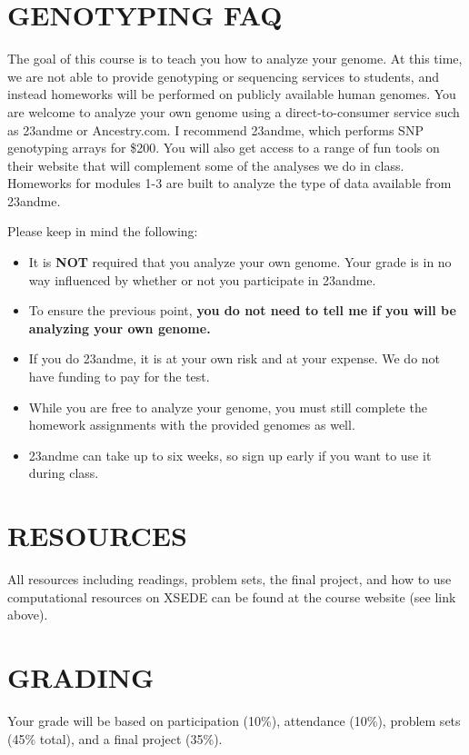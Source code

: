 \documentclass[12pt]{article}
\begin{document}
\section*{GENOTYPING FAQ}
The goal of this course is to teach you how to analyze your genome. At this time, we are not able to provide genotyping or sequencing services to students, and instead homeworks will be performed on publicly available human genomes. You are welcome to analyze your own genome using a direct-to-consumer service such as 23andme or Ancestry.com. I recommend 23andme, which performs SNP genotyping arrays for \$200. You will also get access to a range of fun tools on their website that will complement some of the analyses we do in class. Homeworks for modules 1-3 are built to analyze the type of data available from 23andme. 

Please keep in mind the following:
\begin{itemize}
\setlength\itemsep{0.0em}
\item It is \textbf{NOT} required that you analyze your own genome. Your grade is in no way influenced by whether or not you participate in 23andme.
\item To ensure the previous point, \textbf{you do not need to tell me if you will be analyzing your own genome.}
\item If you do 23andme, it is at your own risk and at your expense. We do not have funding to pay for the test.
\item While you are free to analyze your genome, you must still complete the homework assignments with the provided genomes as well.
\item 23andme can take up to six weeks, so sign up early if you want to use it during class.
\end{itemize}

\section*{RESOURCES}
All resources including readings, problem sets, the final project, and how to use computational resources on XSEDE can be found at the course website (see link above).

\section*{GRADING}
Your grade will be based on participation (10\%), attendance (10\%), problem sets (45\% total), and a final project (35\%).
\end{document}
